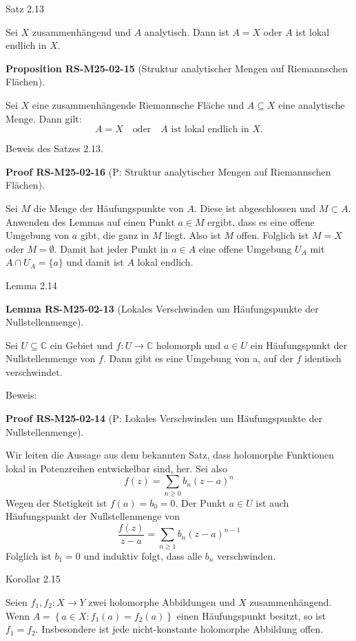 \documentclass[10pt, letterpaper]{article}
\newcommand{\CustomHeading}[3]{%
  \par\medskip\noindent%
  \textbf{#1 #2} \textnormal{(#3)}.\enskip%
}
\newenvironment{PROP}[2]{\begin{unitbox}\CustomHeading{Proposition}{#1}{#2}}{\end{unitbox}}
\newenvironment{LEM}[2]{\begin{unitbox}\CustomHeading{Lemma}{#1}{#2}}{\end{unitbox}}
\newenvironment{PROOF}[2]{\begin{unitbox}\CustomHeading{Proof}{#1}{#2}}{\end{unitbox}}
\begin{document}
Satz 2.13 

Sei $X$ zusammenhängend und $A$ analytisch. Dann ist $A=X$ oder $A$ ist lokal endlich in $X$.


\begin{PROP}{RS-M25-02-15}{Struktur analytischer Mengen auf Riemannschen Flächen}
Sei $X$ eine zusammenhängende Riemannsche Fläche und $A\subseteq X$ eine analytische Menge.  
Dann gilt:
\[
A = X \quad \text{oder} \quad A \text{ ist lokal endlich in } X.
\]
\end{PROP}

Beweis des Satzes 2.13. 

\begin{PROOF}{RS-M25-02-16}{P: Struktur analytischer Mengen auf Riemannschen Flächen}
Sei $M$ die Menge der Häufungspunkte von $A$. Diese ist abgeschlossen und $M \subset A$. Anwenden des Lemmas auf einen Punkt $a \in M$ ergibt, dass es eine offene Umgebung von $a$ gibt, die ganz in $M$ liegt. Also ist $M$ offen. Folglich ist $M=X$ oder $M=\emptyset$. Damit hat jeder Punkt in $a \in A$ eine offene Umgebung $U_{A}$ mit $A \cap U_{A}=\{a\}$ und damit ist $A$ lokal endlich.
\end{PROOF}


Lemma 2.14 

\begin{LEM}{RS-M25-02-13}{Lokales Verschwinden um Häufungspunkte der Nullstellenmenge}
Sei $U \subseteq \mathbb{C}$ ein Gebiet und $f: U \longrightarrow \mathbb{C}$ holomorph und $a \in U$ ein Häufungspunkt der Nullstellenmenge von $f$. Dann gibt es eine Umgebung von a, auf der $f$ identisch verschwindet.
\end{LEM}

Beweis: 

\begin{PROOF}{RS-M25-02-14}{P: Lokales Verschwinden um Häufungspunkte der Nullstellenmenge}
Wir leiten die Aussage aus dem bekannten Satz, dass holomorphe Funktionen lokal in Potenzreihen entwickelbar sind, her. Sei also
$$
f(z)=\sum_{n \geq 0} b_{n}(z-a)^{n}
$$
Wegen der Stetigkeit ist $f(a)=b_{0}=0$. Der Punkt $a \in U$ ist auch Häufungspunkt der Nullstellenmenge von
$$
\frac{f(z)}{z-a}=\sum_{n \geq 1} b_{n}(z-a)^{n-1}
$$
Folglich ist $b_{1}=0$ und induktiv folgt, dass alle $b_{n}$ verschwinden.
\end{PROOF}


Korollar 2.15 

Seien $f_{1}, f_{2}: X \longrightarrow Y$ zwei holomorphe Abbildungen und $X$ zusammenhängend. Wenn $A=\left\{a \in X: f_{1}(a)=f_{2}(a)\right\}$ einen Häufungspunkt besitzt, so ist $f_{1}=f_{2}$. Insbesondere ist jede nicht-konstante holomorphe Abbildung offen.
\end{document}
